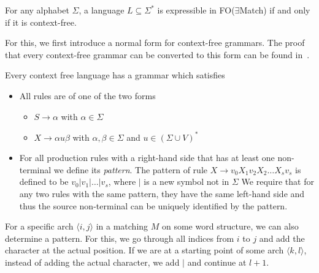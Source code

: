 \begin{theorem}
    For any alphabet $\Sigma$, a language $L \subseteq \Sigma^{*}$ is expressible in FO($\exists$Match) if and only if it is context-free.
\end{theorem}

For this, we first introduce a normal form for context-free grammars.
The proof that every context-free grammar can be converted to this form can be found in~\cite{Lautemann1995}.
\begin{lemma}
    Every context free language has a grammar which satisfies
    \begin{itemize}
        \setlength\itemsep{0.2em}
        \item All rules are of one of the two forms
        \begin{itemize}
            \setlength\itemsep{0.2em}
            \item $S \to \alpha$ with $\alpha \in \Sigma$
            \item $X \to \alpha u \beta$ with $\alpha, \beta \in \Sigma$ and $u \in (\Sigma \cup V)^{*}$
        \end{itemize}
        \item For all production rules with a right-hand side that has at least one non-terminal we define its \emph{pattern}.
        The pattern of rule $X \to v_{0}X_{1}v_{2}X_{2}\dots X_{s}v_{s}$ is defined to be $v_{0}|v_{1}|\dots|v_{s}$, where $|$ is a new symbol not in $\Sigma$
        We require that for any two rules with the same pattern, they have the same left-hand side and thus the source non-terminal can be uniquely identified by the pattern.
    \end{itemize}
\end{lemma}

For a specific arch $\langle i, j \rangle$ in a matching $M$ on some word structure, we can also determine a pattern.
For this, we go through all indices from $i$ to $j$ and add the character at the actual position.
If we are at a starting point of some arch $\langle k, l \rangle$, instead of adding the actual character, we add $|$ and continue at $l + 1$.

